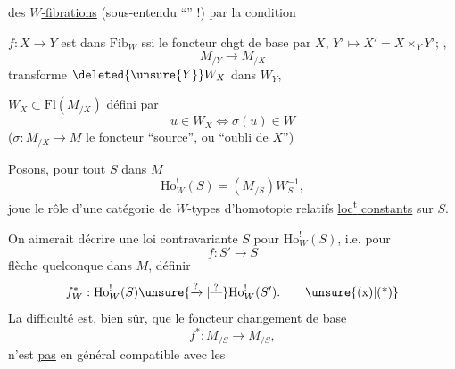 
des \uline{$W$-fibrations} (sous-entendu ``'' !) par la condition

$f:X\to Y$ est dans $\mathrm{Fib}_W$ ssi  le foncteur chgt de base par $X$, $Y'\mapsto X'=X\times_Y Y'$; ,
\[
M_{/Y}\longrightarrow M_{/X}
\]
transforme $\deleted{\unsure{Y}}W_X$ dans $W_Y$,

 \quad $W_X\subset\mathrm{Fl}(M_{/X})$ défini par
\[
u\in W_X\Longleftrightarrow\sigma(u)\in W
\]
($\sigma:M_{/X}\to M$ le foncteur ``source'', ou ``oubli de $X$'')

Posons, pour tout $S$ dans $M$
\[
\mathrm{Ho}^{!}_W(S)=(M_{/S})W_S^{-1},
\]
 joue le rôle d'une catégorie de $W$-types d'homotopie relatifs \uline{loc\textsuperscript{t} constants} sur $S$.

On aimerait décrire une loi contravariante  $S$ pour $\mathrm{Ho}^{!}_W(S)$, i.e. pour
\[
f:S'\longrightarrow S
\]
flèche quelconque dans $M$, définir
\[
f^{*}_W:\mathrm{Ho}^{!}_W(S)\unsure{\xrightarrow{?}|\overset{?}{\text{---}}}\mathrm{Ho}^{!}_W(S').\tag*{\unsure{(x)|(*)}}
\]
La difficulté est, bien sûr, que le foncteur changement de base
\[
f^{*}:M_{/S}\longrightarrow M_{/S},
\]
n'est \uline{pas} en général compatible avec les
